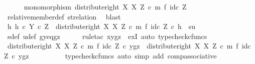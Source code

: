 \begin{isabellebody}
\ \ \ \ \isamarkupfalse%
\ {\isachardoublequoteopen}monomorphism\ {\isacharparenleft}{\kern0pt}distribute{\isacharunderscore}{\kern0pt}right\ X\ X\ Z\ {\isasymcirc}\isactrlsub c\ m\ {\isasymtimes}\isactrlsub f\ id\isactrlsub c\ Z{\isacharparenright}{\kern0pt}{\isachardoublequoteclose}\isanewline
\ \ \ \ \ \ \isamarkupfalse%
\ relative{\isacharunderscore}{\kern0pt}member{\isacharunderscore}{\kern0pt}def{}\ st{\isacharunderscore}{\kern0pt}relation\ \isamarkupfalse%
\ blast\isanewline
\isanewline
\ \ \ \ \isamarkupfalse%
\ {\isachardoublequoteopen}{\isasymexists}h{\isachardot}{\kern0pt}\ h\ {\isasymin}\isactrlsub c\ Y\ {\isasymtimes}\isactrlsub c\ Z\ {\isasymand}\ {\isacharparenleft}{\kern0pt}distribute{\isacharunderscore}{\kern0pt}right\ X\ X\ Z\ {\isasymcirc}\isactrlsub c\ m\ {\isasymtimes}\isactrlsub f\ id\isactrlsub c\ Z{\isacharparenright}{\kern0pt}\ {\isasymcirc}\isactrlsub c\ h\ {\isacharequal}{\kern0pt}\ {\isasymlangle}s{\isacharcomma}{\kern0pt}u{\isasymrangle}{\isachardoublequoteclose}\isanewline
\ \ \ \ \ \ \isamarkupfalse%
\ s{\isacharunderscore}{\kern0pt}def\ u{\isacharunderscore}{\kern0pt}def\ gy{\isacharunderscore}{\kern0pt}eq{\isacharunderscore}{\kern0pt}gz\isanewline
\ \ \ \ \isamarkupfalse%
\ {\isacharparenleft}{\kern0pt}rule{\isacharunderscore}{\kern0pt}tac\ x{\isacharequal}{\kern0pt}{\isachardoublequoteopen}{\isasymlangle}y{\isacharcomma}{\kern0pt}gz{\isasymrangle}{\isachardoublequoteclose}\ \ exI{\isacharcomma}{\kern0pt}\ auto{\isacharcomma}{\kern0pt}\ typecheck{\isacharunderscore}{\kern0pt}cfuncs{\isacharparenright}{\kern0pt}\isanewline
\ \ \ \ \ \ \isamarkupfalse%
\ {\isachardoublequoteopen}{\isacharparenleft}{\kern0pt}distribute{\isacharunderscore}{\kern0pt}right\ X\ X\ Z\ {\isasymcirc}\isactrlsub c\ m\ {\isasymtimes}\isactrlsub f\ id\isactrlsub c\ Z{\isacharparenright}{\kern0pt}\ {\isasymcirc}\isactrlsub c\ {\isasymlangle}y{\isacharcomma}{\kern0pt}gz{\isasymrangle}\ {\isacharequal}{\kern0pt}\ distribute{\isacharunderscore}{\kern0pt}right\ X\ X\ Z\ {\isasymcirc}\isactrlsub c\ {\isacharparenleft}{\kern0pt}m\ {\isasymtimes}\isactrlsub f\ id\isactrlsub c\ Z{\isacharparenright}{\kern0pt}\ {\isasymcirc}\isactrlsub c\ {\isasymlangle}y{\isacharcomma}{\kern0pt}gz{\isasymrangle}{\isachardoublequoteclose}\isanewline
\ \ \ \ \ \ \ \ \isamarkupfalse%
\ {\isacharparenleft}{\kern0pt}typecheck{\isacharunderscore}{\kern0pt}cfuncs{\isacharcomma}{\kern0pt}\ auto\ simp\ add{\isacharcolon}{\kern0pt}\ comp{\isacharunderscore}{\kern0pt}associative{}{\isacharparenright}{\kern0pt}\isanewline

\end{isabellebody}
